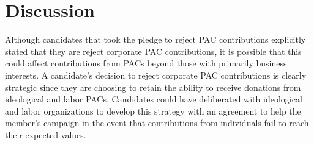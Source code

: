 \documentclass[12pt]{article}
\begin{document}
\section{Discussion} \label{sec: discussion}

 Although candidates that took the pledge to reject PAC contributions explicitly stated that they are reject corporate PAC contributions, it is possible that this could affect contributions from PACs beyond those with primarily business interests. A candidate's decision to reject corporate PAC contributions is clearly strategic since they are choosing to retain the ability to receive donations from ideological and labor PACs. Candidates could have deliberated with ideological and labor organizations to develop this strategy with an agreement to help the member's campaign in the event that contributions from individuals fail to reach their expected values. 


\pagebreak
\singlespacing
{}
%
\printbibliography
\pagebreak
\end{document}
